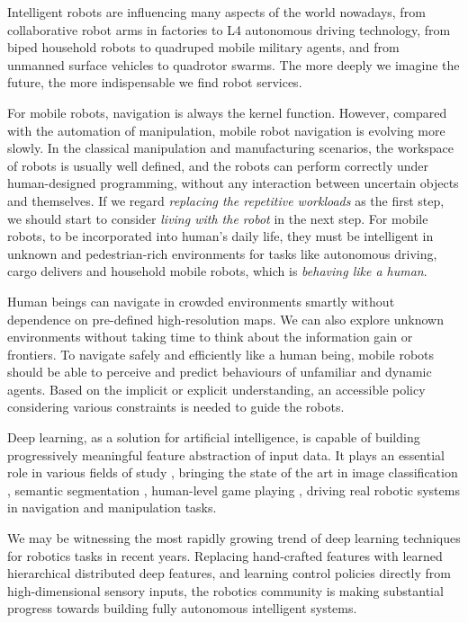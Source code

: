 
Intelligent robots are influencing many aspects of the world nowadays, from collaborative robot arms in factories to L4 autonomous driving technology, from biped household robots to quadruped mobile military agents, and from unmanned surface vehicles to quadrotor swarms. The more deeply we imagine the future, the more indispensable we find robot services.

For mobile robots, navigation is always the kernel function. However, compared with the automation of manipulation, mobile robot navigation is evolving more slowly. In the classical manipulation and manufacturing scenarios, the workspace of robots is usually well defined, and the robots can perform correctly under human-designed programming, without any interaction between uncertain objects and themselves. If we regard \textit{replacing the repetitive workloads} as the first step, we should start to consider \textit{living with the robot} in the next step. For mobile robots, to be incorporated into human's daily life, they must be intelligent in unknown and pedestrian-rich environments for tasks like autonomous driving, cargo delivers and household mobile robots, which is \textit{behaving like a human}.

Human beings can navigate in crowded environments smartly without dependence on pre-defined high-resolution maps. We can also explore unknown environments without taking time to think about the information gain or frontiers. To navigate safely and efficiently like a human being, mobile robots should be able to perceive and predict behaviours of unfamiliar and dynamic agents. Based on the implicit or explicit understanding, an accessible policy considering various constraints is needed to guide the robots.


Deep learning, as a solution for artificial intelligence, is capable of building progressively meaningful feature abstraction of input data.
It plays an essential role in various fields of study \cite{Goodfellow-et-al-2016}, bringing the state of the art in image classification \cite{he2016deep,huang2017densely, krizhevsky2012imagenet},
semantic segmentation \cite{chen2016deeplab, long2015fully},
human-level game playing \cite{mnih2016asynchronous, mnih2015human}, driving real robotic systems in navigation \cite{tai2017virtual, zhang2017deep, zhu2017target}
and manipulation \cite{levine2016end,yu2018one} tasks.

We may be witnessing the most rapidly growing trend of deep learning techniques for robotics tasks in recent years.
Replacing hand-crafted features with learned hierarchical distributed deep features, and learning control policies directly from high-dimensional sensory inputs, the robotics community is making substantial progress towards building fully autonomous intelligent systems.
